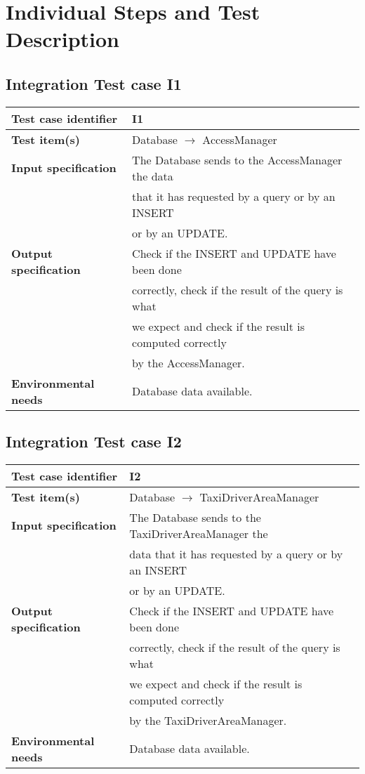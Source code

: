 \section{Individual	Steps	and	Test	Description}
	\subsection{Integration Test case I1}
		\begin{tabular}{ l l}
			\hline 		\textbf{Test case identifier} & I1 \\
			\hline		\textbf{Test item(s)}  & Database $\rightarrow$ AccessManager \\
			\hline		\textbf{Input specification} & The Database sends to the AccessManager the data \\ & that it has requested by a query or by an INSERT \\ & or by an UPDATE. \\
			\hline		\textbf{Output specification} & Check if the INSERT and UPDATE have been done\\ & correctly, check if the result of the query is what\\ &  we expect and check if the result is computed correctly\\ & by the AccessManager.\\
			\hline		\textbf{Environmental needs} & Database data available.\\
			\hline
		\end{tabular}
	\subsection{Integration Test case I2}
		\begin{tabular}{ l l}
			\hline 		\textbf{Test case identifier} & I2 \\
			\hline		\textbf{Test item(s)}  & Database $\rightarrow$ TaxiDriverAreaManager \\
			\hline		\textbf{Input specification} & The Database sends to the TaxiDriverAreaManager the\\ & data that it has requested by a query or by an INSERT \\ & or by an UPDATE.\\
			\hline		\textbf{Output specification} &  Check if the INSERT and UPDATE have been done\\ & correctly, check if the result of the query is what\\ &  we expect and check if the result is computed correctly\\ & by the TaxiDriverAreaManager.\\
			\hline		\textbf{Environmental needs} & Database data available.\\
			\hline
		\end{tabular}
